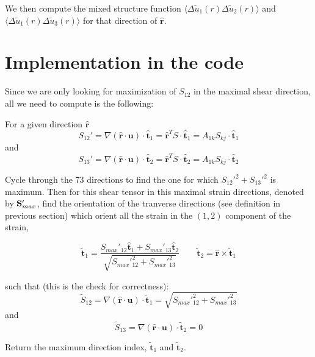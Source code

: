 \documentclass[12pt]{article}
\begin{document}
We then compute the mixed structure function $\langle \Delta \tilde u_1 (r) 
\Delta \tilde u_2 (r)\rangle$ and 
$\langle \Delta \tilde u_1 (r) \Delta \tilde u_3 (r)\rangle$ for that direction of $\bm{{\hat r}}$.

\section*{Implementation in the code}
Since we are only looking for maximization of $S_{12}$ in the
maximal shear direction, all we need to compute is the following:

For a given direction $\hat{\bm{r}}$
\begin{equation}
{S}_{12}' = \nabla (\hat {\bm{r}} \cdot \bm{u}) \cdot \hat{\bm{t}}_1
= \hat {\bm{r}}^T  S \cdot \hat{\bm{t}}_1 
= A_{1k} S_{kj} \cdot \hat{\bm{ t}}_1 
\end{equation}
and 
\begin{equation}
{S}_{13}' = \nabla (\hat {\bm{r}} \cdot \bm{u}) \cdot \hat{\bm{t}}_2
= \hat {\bm{r}}^T  S \cdot \hat{\bm{t}}_2 
= A_{1k} S_{kj} \cdot \hat{\bm{ t}}_2 
\end{equation}

Cycle through the 73 directions to find the one for which ${S}_{12}'^2
+ {S}_{13}'^2$ is maximum. Then for this shear tensor in this maximal
strain directions, denoted by
${\bf S}_{max}'$, find the orientation of the tranverse directions (see
definition in previous section) which orient all the strain in the
$(1,2)$ component of the strain,

\begin{equation}
\bm{{\tilde t}}_1 = \frac{S_{max}'_{12} \bm{{\hat t}}_1 +  S_{max}'_{13} \bm{{\hat t}}_2 }
                         {\sqrt{S_{max}'_{12}^2 +  S_{max}'_{13}^2 }}
\qquad
\bm{{\tilde t}}_2 = \bm{{\hat r}} \times \bm{{\tilde t}}_1
\end{equation}

such that (this is the check for correctness):
\begin{equation}
{\tilde S}_{12} = \nabla (\hat{\bm{r}} \cdot \bm{u}) \cdot \tilde{\bm{t}}_1
= \sqrt{S_{max}'_{12}^2 +  S_{max}'_{13}^2 }
\end{equation}
and
\begin{equation}
{\tilde S}_{13} = \nabla (\hat{\bm{r}} \cdot \bm{u}) \cdot \tilde{\bm{t}}_2
= 0
\end{equation}

Return the maximum direction index, $\bm{{\tilde t}}_1$ and $\bm{{\tilde t}}_2$.
\end{document}
